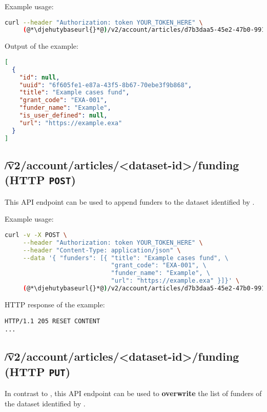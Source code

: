   Example usage:
\begin{lstlisting}[language=bash]
curl --header "Authorization: token YOUR_TOKEN_HERE" \
     (@*\djehutybaseurl{}*@)/v2/account/articles/d7b3daa5-45e2-47b0-9910-0f7fa6a995b1/funding | jq
\end{lstlisting}

  Output of the example:
\begin{lstlisting}[language=JSON]
[
  {
    "id": null,
    "uuid": "6f605fe1-e87a-43f5-8b67-70ebe3f9b868",
    "title": "Example cases fund",
    "grant_code": "EXA-001",
    "funder_name": "Example",
    "is_user_defined": null,
    "url": "https://example.exa"
  }
]
\end{lstlisting}

\subsection{\t{/v2/account/articles/<dataset-id>/funding} (HTTP \texttt{POST})}
\label{sec:api-v2-articles-funding-post}

  This API endpoint can be used to append funders to the dataset identified
  by \code{dataset-id}.

  Example usage:
\begin{lstlisting}[language=bash]
curl -v -X POST \
     --header "Authorization: token YOUR_TOKEN_HERE" \
     --header "Content-Type: application/json" \
     --data '{ "funders": [{ "title": "Example cases fund", \
                             "grant_code": "EXA-001", \
                             "funder_name": "Example", \
                             "url": "https://example.exa" }]}' \
     (@*\djehutybaseurl{}*@)/v2/account/articles/d7b3daa5-45e2-47b0-9910-0f7fa6a995b1/funding
\end{lstlisting}

  HTTP response of the example:
\begin{lstlisting}
HTTP/1.1 205 RESET CONTENT
...
\end{lstlisting}

\subsection{\t{/v2/account/articles/<dataset-id>/funding} (HTTP \texttt{PUT})}

  In contrast to , this API endpoint
  can be used to \textbf{overwrite} the list of funders of the dataset
  identified by .

